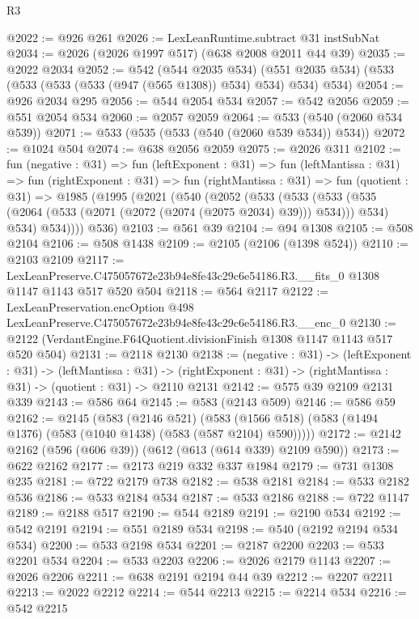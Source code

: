 \begin{lexlean}{R3}
\begin{coremodule}
@2022 := @926 @261
@2026 := LexLeanRuntime.subtract @31 instSubNat
@2034 := @2026 (@2026 @1997 @517) (@638 @2008 @2011 @44 @39)
@2035 := @2022 @2034
@2052 := @542
    (@544 @2035 @534)
    (@551 @2035 @534)
    (@533 (@533 (@533 (@533 (@947 (@565 @1308)) @534) @534) @534) @534)
@2054 := @926 @2034 @295
@2056 := @544 @2054 @534
@2057 := @542 @2056
@2059 := @551 @2054 @534
@2060 := @2057 @2059
@2064 := @533 (@540 (@2060 @534 @539))
@2071 := @533 (@535 (@533 (@540 (@2060 @539 @534)) @534))
@2072 := @1024 @504
@2074 := @638 @2056 @2059
@2075 := @2026 @311
@2102 := fun (negative : @31) =>
  fun (leftExponent : @31) =>
  fun (leftMantissa : @31) =>
  fun (rightExponent : @31) =>
  fun (rightMantissa : @31) =>
  fun (quotient : @31) =>
  @1985
    (@1995
      (@2021
        (@540
          (@2052
            (@533
              (@533
                (@533 (@535 (@2064 (@533 (@2071 (@2072 (@2074 (@2075 @2034) @39))) @534))) @534)
                @534)
              @534))))
      @536)
@2103 := @561 @39
@2104 := @94 @1308
@2105 := @508 @2104
@2106 := @508 @1438
@2109 := @2105 (@2106 (@1398 @524))
@2110 := @2103 @2109
@2117 := LexLeanPreserve.C475057672e23b94e8fe43c29c6e54186.R3.__fits_0
    @1308
    @1147
    @1143
    @517
    @520
    @504
@2118 := @564 @2117
@2122 := LexLeanPreservation.encOption
    @498
    LexLeanPreserve.C475057672e23b94e8fe43c29c6e54186.R3.__enc_0
@2130 := @2122 (VerdantEngine.F64Quotient.divisionFinish @1308 @1147 @1143 @517 @520 @504)
@2131 := @2118 @2130
@2138 := (negative : @31) ->
  (leftExponent : @31) ->
  (leftMantissa : @31) ->
  (rightExponent : @31) -> (rightMantissa : @31) -> (quotient : @31) -> @2110 @2131
@2142 := @575 @39 @2109 @2131 @339
@2143 := @586 @64
@2145 := @583 (@2143 @509)
@2146 := @586 @59
@2162 := @2145
    (@583
      (@2146 @521)
      (@583 (@1566 @518) (@583 (@1494 @1376) (@583 (@1040 @1438) (@583 (@587 @2104) @590)))))
@2172 := @2142 @2162 (@596 (@606 @39)) (@612 (@613 (@614 @339) @2109 @590))
@2173 := @622 @2162
@2177 := @2173 @219 @332 @337 @1984
@2179 := @731 @1308 @235
@2181 := @722 @2179 @738
@2182 := @538 @2181
@2184 := @533 @2182 @536
@2186 := @533 @2184 @534
@2187 := @533 @2186
@2188 := @722 @1147
@2189 := @2188 @517
@2190 := @544 @2189
@2191 := @2190 @534
@2192 := @542 @2191
@2194 := @551 @2189 @534
@2198 := @540 (@2192 @2194 @534 @534)
@2200 := @533 @2198 @534
@2201 := @2187 @2200
@2203 := @533 @2201 @534
@2204 := @533 @2203
@2206 := @2026 @2179 @1143
@2207 := @2026 @2206
@2211 := @638 @2191 @2194 @44 @39
@2212 := @2207 @2211
@2213 := @2022 @2212
@2214 := @544 @2213
@2215 := @2214 @534
@2216 := @542 @2215

\end{coremodule}
\end{lexlean}
